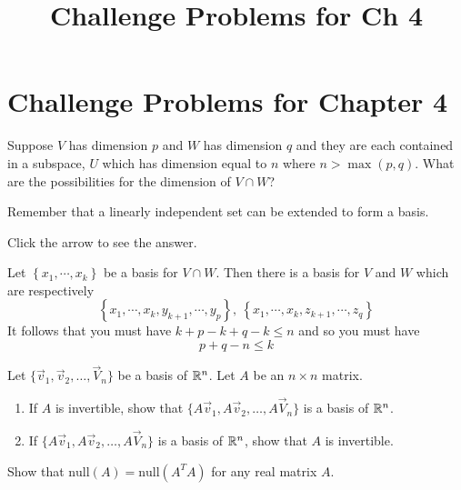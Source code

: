 \documentclass{ximera}
\title{Challenge Problems for Ch 4} \license{CC BY-NC-SA 4.0}
\begin{document}
\begin{abstract}
\end{abstract}
\maketitle

\section*{Challenge Problems for Chapter 4}

\begin{problem}\label{prb:5.29} Suppose $V$ has dimension $p$ and $W$ has dimension $q$ and they
are each contained in a subspace, $U$ which has dimension equal to $n$ where
$n>\max \left( p,q\right).$ What are the possibilities for the dimension of
$V\cap W$? 

\begin{hint}
Remember that a linearly independent set can be extended to form a basis.
\end{hint}

Click the arrow to see the answer.
\begin{expandable}
Let $\left\{ x_{1},\cdots ,x_{k}\right\} $ be a
basis for $V\cap W.$ Then there is a basis for $V$ and $W$ which are
respectively
\[
\left\{ x_{1},\cdots ,x_{k},y_{k+1},\cdots ,y_{p}\right\} ,\ \left\{
x_{1},\cdots ,x_{k},z_{k+1},\cdots ,z_{q}\right\}
\]
It follows that you must have $k+p-k+q-k\leq n$ and so you must have
\[
p+q-n\leq k
\]
\end{expandable}
\end{problem}

\begin{problem}\label{prob:nich6.2}
    Let $\{\vec{v}_1, \vec{v}_2, \dots, \vec{V}_n\}$ be a basis of $\mathbb{R}^n$.  Let $A$ be an $n\times n$ matrix.
    \begin{enumerate}
        \item If $A$ is invertible, show that $\{A\vec{v}_1, A\vec{v}_2, \dots, A\vec{V}_n\}$ is a basis of $\mathbb{R}^n$.
        \item If $\{A\vec{v}_1, A\vec{v}_2, \dots, A\vec{V}_n\}$ is a basis of $\mathbb{R}^n$, show that $A$ is invertible.
    \end{enumerate}
\end{problem}

\begin{problem}\label{prob:nich6.4}
    Show that $\text{null}(A)=\text{null}(A^TA)$ for any real matrix $A$. 
\end{problem}
\end{document}
